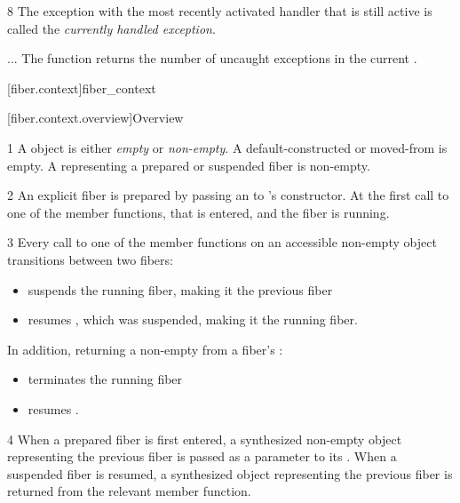 8 The exception with the most recently activated handler
 that is still active is called the
\emph{currently handled exception}.


... The function 
returns the number of uncaught exceptions in the current .


\setcounter{section}{33}
\setcounter{subsection}{11}
\setcounter{secnumdepth}{4}

\cbstart

[fiber.context]{fiber\_context}

[fiber.context.overview]{Overview}

1 A \fiber object is either \emph{empty} or \emph{non-empty}. A
default-constructed or moved-from \fiber is empty. A \fiber
representing a prepared or suspended fiber is non-empty.

2 An explicit fiber is prepared by passing an \emph{\entryfn} to \fiber's
constructor. At the first call to one of the \anyresume member functions,
that \entryfn is entered, and the fiber is running.

3 Every call to one of the \anyresume member functions on an accessible
non-empty \fiber object transitions between two fibers:
\begin{itemize}
    \item suspends the running fiber, making it the previous fiber
    \item resumes \thisfiber, which was suspended, making it the running fiber.
\end{itemize}
In addition, returning a non-empty \fiber from a fiber's \entryfn:
\begin{itemize}
    \item terminates the running fiber
    \item resumes .
\end{itemize}

4 When a prepared fiber is first entered, a synthesized non-empty \fiber
object representing the previous fiber is passed as a parameter to
its \entryfn. When a suspended fiber is resumed, a synthesized \fiber object
representing the previous fiber is returned from the relevant \anyresume
member function.

